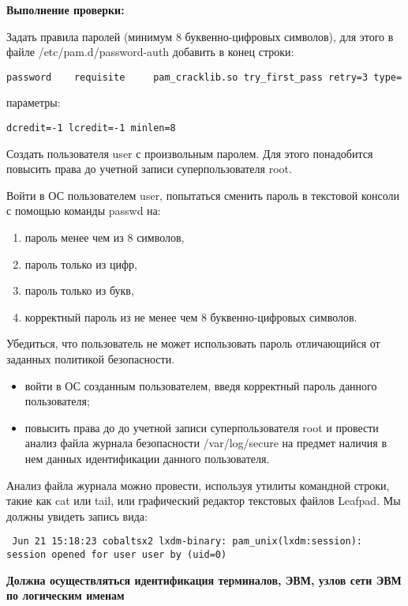\documentclass[a4paper,10pt,twoside]{article}
\begin{document}
\textbf{Выполнение проверки:}

Задать правила паролей (минимум 8 буквенно-цифровых символов), для этого в файле /etc/pam.d/password-auth добавить в конец строки:
\begin{verbatim}
password    requisite     pam_cracklib.so try_first_pass retry=3 type=
\end{verbatim}  
параметры:
\begin{verbatim}
dcredit=-1 lcredit=-1 minlen=8\end{verbatim} 

Создать пользователя user с произвольным паролем. Для этого понадобится повысить права до учетной записи суперпользователя root.

Войти в ОС пользователем user, попытаться сменить пароль в текстовой консоли с помощью команды passwd на:
\begin{enumerate}
\item пароль менее чем из 8 символов,
\item пароль только из цифр,
\item пароль только из букв,
\item корректный пароль из не менее чем 8 буквенно-цифровых символов.
\end{enumerate}


Убедиться, что пользователь не может использовать пароль отличающийся от заданных политикой безопасности.

\begin{itemize}
 \item войти в ОС созданным пользователем, введя корректный пароль данного пользователя;
\item повысить права до  до учетной записи суперпользователя root и провести анализ файла журнала безопасности /var/log/secure на предмет наличия в нем данных идентификации данного пользователя.
\end{itemize}



Анализ  файла журнала можно провести, используя утилиты командной строки, такие как cat или tail, или графический редактор текстовых файлов Leafpad.
Мы должны увидеть запись вида:
\begin{verbatim}
 Jun 21 15:18:23 cobaltsx2 lxdm-binary: pam_unix(lxdm:session): session opened for user user by (uid=0)
\end{verbatim} 

 \textbf{Должна осуществляться идентификация терминалов, ЭВМ, узлов сети ЭВМ по логическим именам}
\end{document}
